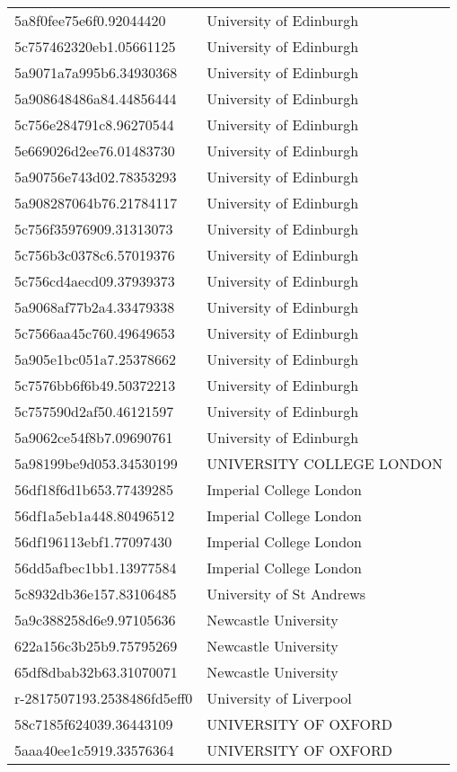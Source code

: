 \begin{tabular}{ll}
5a8f0fee75e6f0.92044420 & University of Edinburgh \\
5c757462320eb1.05661125 & University of Edinburgh \\
5a9071a7a995b6.34930368 & University of Edinburgh \\
5a908648486a84.44856444 & University of Edinburgh \\
5c756e284791c8.96270544 & University of Edinburgh \\
5e669026d2ee76.01483730 & University of Edinburgh \\
5a90756e743d02.78353293 & University of Edinburgh \\
5a908287064b76.21784117 & University of Edinburgh \\
5c756f35976909.31313073 & University of Edinburgh \\
5c756b3c0378c6.57019376 & University of Edinburgh \\
5c756cd4aecd09.37939373 & University of Edinburgh \\
5a9068af77b2a4.33479338 & University of Edinburgh \\
5c7566aa45c760.49649653 & University of Edinburgh \\
5a905e1bc051a7.25378662 & University of Edinburgh \\
5c7576bb6f6b49.50372213 & University of Edinburgh \\
5c757590d2af50.46121597 & University of Edinburgh \\
5a9062ce54f8b7.09690761 & University of Edinburgh \\
5a98199be9d053.34530199 & UNIVERSITY COLLEGE LONDON \\
56df18f6d1b653.77439285 & Imperial College London \\
56df1a5eb1a448.80496512 & Imperial College London \\
56df196113ebf1.77097430 & Imperial College London \\
56dd5afbec1bb1.13977584 & Imperial College London \\
5c8932db36e157.83106485 & University of St Andrews \\
5a9c388258d6e9.97105636 & Newcastle University \\
622a156c3b25b9.75795269 & Newcastle University \\
65df8dbab32b63.31070071 & Newcastle University \\
r-2817507193.2538486fd5eff0 & University of Liverpool \\
58c7185f624039.36443109 & UNIVERSITY OF OXFORD \\
5aaa40ee1c5919.33576364 & UNIVERSITY OF OXFORD \\

\end{tabular}

